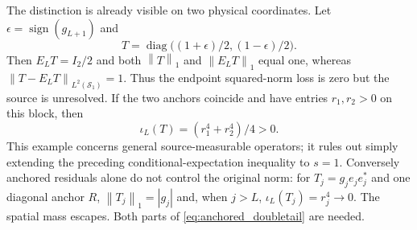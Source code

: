 \documentclass[11pt,a4paper]{amsart}
\numberwithin{equation}{section}
\theoremstyle{definition}
\theoremstyle{remark}
\newcommand{\Sch}{\mathcal S}
\DeclareMathOperator{\diag}{diag}
\newcommand{\norm}[1]{\left\lVert#1\right\rVert}
\begin{document}
The distinction is already visible on two physical coordinates. Let $\epsilon=\operatorname{sign}(g_{L+1})$ and
\[
 T=\diag\big((1+\epsilon)/2,(1-\epsilon)/2\big).
\]
Then $E_LT=I_2/2$ and both $\norm T_1$ and $\norm{E_LT}_1$ equal one, whereas
$\norm{T-E_LT}_{L^2(\Sch_1)}=1$. Thus the endpoint squared-norm loss is zero but the source is unresolved. If the two anchors coincide and have entries $r_1,r_2>0$ on this block, then
\begin{equation}\label{eq:trace_source_flat_face}
 \iota_L(T)=(r_1^4+r_2^4)/4>0.
\end{equation}
This example concerns general source-measurable operators; it rules out simply extending the preceding conditional-expectation inequality to $s=1$. Conversely anchored residuals alone do not control the original norm: for $T_j=g_je_je_j^*$ and one diagonal anchor $R$, $\norm{T_j}_1=|g_j|$ and, when $j>L$, $\iota_L(T_j)=r_j^4\to0$. The spatial mass escapes. Both parts of \eqref{eq:anchored_doubletail} are needed.
\end{document}
